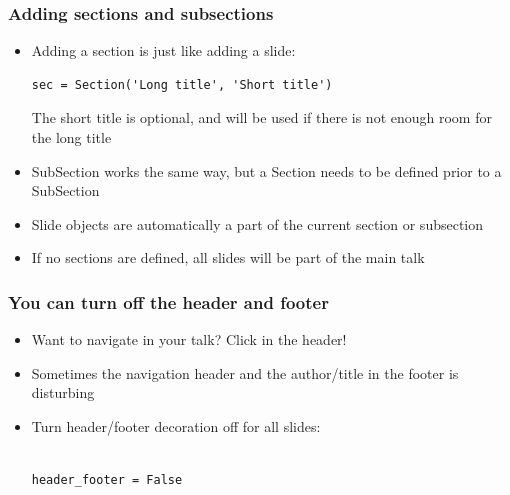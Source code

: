 \documentclass{beamer}
\begin{document}
\begin{frame}[fragile]
\frametitle{Adding sections and subsections}

\begin{block}

\begin{itemize}
\item Adding a section is just like adding a slide: \begin{Verbatim}[fontsize=\footnotesize,tabsize=4,baselinestretch=0.85,fontfamily=tt,xleftmargin=7mm]
sec = Section('Long title', 'Short title')
\end{Verbatim}
The short title is optional, and will be used if there is not enough room for the long title
\item SubSection works the same way, but a Section needs to be defined prior to a SubSection
\item Slide objects are automatically a part of the current section or subsection
\item If no sections are defined, all slides will be part of the main talk
\end{itemize}

\end{block}

\end{frame}

\begin{frame}[fragile]
\frametitle{You can turn off the header and footer}

\begin{block}

\begin{itemize}
\item Want to navigate in your talk? Click in the header!
\item Sometimes the navigation header and the author/title in the footer is disturbing
\item Turn header/footer decoration off for all slides:\begin{Verbatim}[fontsize=\footnotesize,tabsize=4,baselinestretch=0.85,fontfamily=tt,xleftmargin=7mm]

header_footer = False
\end{Verbatim}

\end{itemize}

\end{block}

\end{frame}
\end{document}
